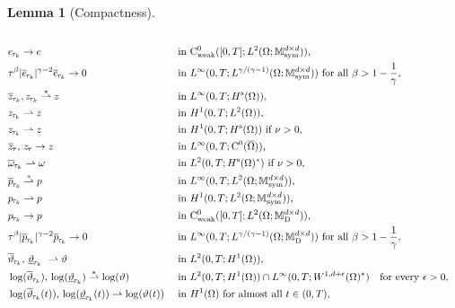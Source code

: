 \documentclass[a4paper,10pt,reqno]{amsart}
\numberwithin{equation}{section}
\newcommand{\bbM}{\mathbb{M}}
\numberwithin{equation}{section}
\newtheorem{lemma}[theorem]{Lemma}
\newcommand{\weakto}{\rightharpoonup} %
\newcommand{\weaksto}{\overset{*}{\rightharpoonup}}
\newcommand{\teta}{\vartheta}
\newcommand{\piecewiseConstant}[2]{\overline{#1}_{\kern-1pt#2}}
\newcommand{\pwc}{\piecewiseConstant}
\newcommand{\upiecewiseConstant}[2]{\underline{#1}_{\kern-1pt#2}}
\newcommand{\upwc}{\upiecewiseConstant}
\newcommand{\piecewiseLinear}[2]{{#1}_{\kern-1pt#2}}
\newcommand{\pwl}{\piecewiseLinear}
\newcommand{\mt}{\bbM}
\newcommand{\sym}{\mathrm{sym}}
\newcommand{\dev}{\mathrm{D}}
\newcommand{\spz}{H^{\mathrm{s}}(\Omega)}
\begin{document}
\begin{lemma}[Compactness]
\begin{subequations}
\begin{align}
\\
&
\label{cvE3-bis}
\pwl e{\tau_k} \to e && \text{ in $\rmC_{\mathrm{weak}}^0([0,T]; L^2(\Omega;\mt_\sym^{d\times d}))$,}
\\
&
\label{cvE3}
\tau^\beta |\pwc e{\tau_k}|^{\gamma-2}  \pwc e{\tau_k} \to 0 && \text{ in $L^{\infty}(0,T; L^{\gamma/(\gamma{-}1)}(\Omega; \mt_\sym^{d\times d}))$ for all } \beta > 1-\frac1\gamma,
 \\
 &
 \label{cvZ1}
 \pwc z{\tau_k}, \pwl z{\tau_k} \weaksto z && \text{ in $L^\infty (0,T;\spz)$},
 \\
 & 
 \label{cvZ2}
 \pwl{ z}{\tau_k} \weakto z && \text{ in $H^1(0,T;L^2(\Omega))$}, 
 \\
 & 
 \label{cvZ3}
 \pwl {z}{\tau_k} \weakto z && \text{ in $H^1(0,T;\spz)$ if $\nu>0$},
 \\
 & 
 \label{cvZ4}
  \pwc z \tau,\, \pwl z\tau \to z && \text{ in $L^\infty(0,T;\mathrm{C}^0(\overline\Omega))$},    
 \\
 & 
 \label{cvZ5}
 \pwc {\omega}{\tau_k} \weakto \omega && \text{ in $L^2(0,T;\spz^*)$ if $\nu>0$},
 \\
&
\label{cvP1}
\pwc p{\tau_k} \weaksto p && \text{ in $L^\infty(0,T; L^2(\Omega;\mt_\sym^{d\times d}))$,}
\\
&
\label{cvP2}
\pwl p{\tau_k} \weakto p && \text{ in $H^1(0,T; L^2(\Omega;\mt_\sym^{d\times d}))$,}
\\
&
\label{cvP3-bis}
\pwl p{\tau_k} \to p && \text{ in $\rmC_{\mathrm{weak}}^0([0,T]; L^2(\Omega;\mt_\dev^{d\times d}))$,} \\
&
\label{cvP3}
\tau^\beta|\pwc p{\tau_k}|^{\gamma-2}  \pwc p{\tau_k} \to 0 && \text{ in $L^{\infty}(0,T;   L^{\gamma/(\gamma{-}1)}(\Omega; \mt_\dev^{d\times d}))$ for all } \beta > 1-\frac1\gamma,
\\
 &
 \label{cvT1}
 \pwc \teta{\tau_k}, \, \upwc \teta{\tau_k}\ \weakto \teta && \text{ in $L^2 (0,T; H^1(\Omega))$},
 \\
&
\label{cvT2}
\log(\pwc\teta{\tau_k}),\,  \log(\upwc\teta{\tau_k})   \weaksto  \log(\teta)  &&
\text{ in } L^2 (0,T; H^1(\Omega))  \cap  L^\infty (0,T; W^{1,d+\epsilon}(\Omega)^*)   \quad \text{for every } \epsilon>0,
\\
&
\label{cvT4}
 \log(\pwc\teta{\tau_k}(t)),\,   \log(\upwc\teta{\tau_k}(t))  \weakto \log(\teta(t))   &&   \text{ in $H^1(\Omega)$ for almost all $t \in (0,T)$,}  
\\

\end{align}
\end{subequations}
\end{lemma}
\end{document}
